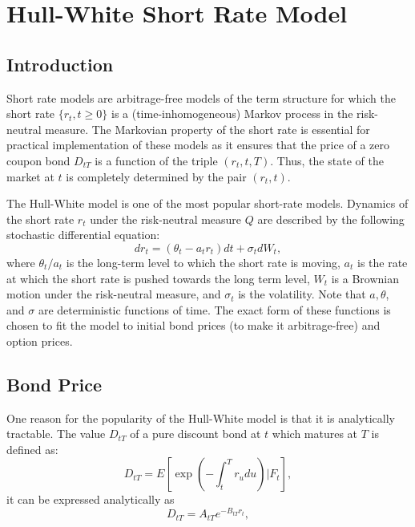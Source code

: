 \chapter{Hull-White Short Rate Model}

\section{Introduction}

Short rate models are arbitrage-free models of the term structure for which the
short rate $\{r_t, t\geq 0\}$ is a (time-inhomogeneous) Markov process in
the risk-neutral measure. The Markovian property of the short rate is essential
for practical implementation of these models
as it ensures that the price of a zero coupon bond $D_{tT}$ is a function of the
triple $(r_t, t, T)$. Thus, the state of the market at $t$ is completely
determined by the pair $(r_t,t)$.

The Hull-White model is one of the most popular short-rate models. Dynamics 
of the short rate $r_t$ under the risk-neutral measure $Q$ are
described by the following stochastic differential equation: 
\begin{equation} \label{E:hw}
    dr_t = (\theta_t - a_t r_t) dt + \sigma_t dW_t,
\end{equation}
where $\theta_t/a_t$ is the long-term level to which the short rate is
moving, $a_t$ is the rate at which the short rate is pushed towards the long
term level, $W_t$ is a Brownian motion under the risk-neutral measure, and
$\sigma_t$ is the volatility. Note that $a, \theta$, and $\sigma$
are deterministic functions of time. The exact form of these functions is chosen
to fit the model to initial bond prices (to make it arbitrage-free) and option
prices.

\section{Bond Price}
One reason for the popularity of the Hull-White model is that it is analytically
tractable. The value $D_{tT}$ of a pure discount bond at $t$ which matures at
$T$ is defined as:
\begin{equation}
  D_{tT} = E \left[ \exp \left( -\int_t^T r_u du \right) | F_t \right],
\end{equation}
it can be expressed analytically as 
\begin{equation}
  D_{tT}=A_{tT} e^{-B_{tT} r_t},
\end{equation}

